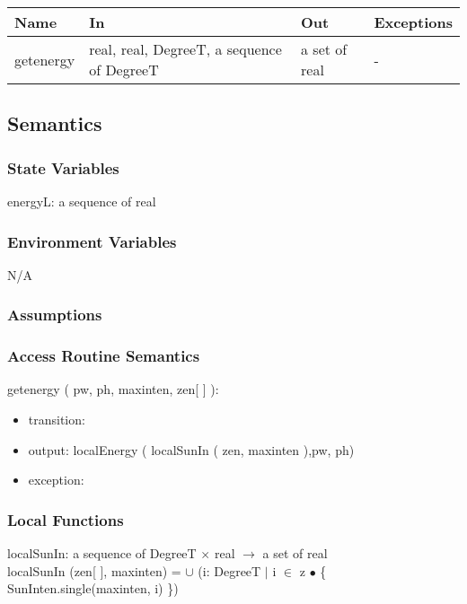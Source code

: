 \documentclass[12pt, titlepage]{article}
\begin{document}
\begin{center}
\begin{tabular}{p{2cm} p{5cm} p{4cm} p{1cm}}
\hline
\textbf{Name} & \textbf{In} & \textbf{Out} & \textbf{Exceptions} \\
\hline 
getenergy & real, real, DegreeT, a sequence of DegreeT & a set of real & - \\


\hline
\end{tabular}
\end{center}


\subsection{Semantics}

\subsubsection{State Variables}

energyL: a sequence of real\\

\subsubsection{Environment Variables}

N/A

\subsubsection{Assumptions}



\subsubsection{ Access Routine Semantics}

\noindent  getenergy ( pw, ph, maxinten, zen[ ] ):
\begin{itemize}
\item transition:
\item output:  localEnergy ( localSunIn ( zen, maxinten ),pw, ph)
\item exception: 
\end{itemize}


\subsubsection{Local Functions}
localSunIn: a sequence of DegreeT $\times$ real $\rightarrow$ a set of real\\
localSunIn (zen[ ], maxinten) = $\cup$ (i: DegreeT $|$ i $\in$ z $\bullet$ \{ SunInten.single(maxinten, i) \})\\
\end{document}
